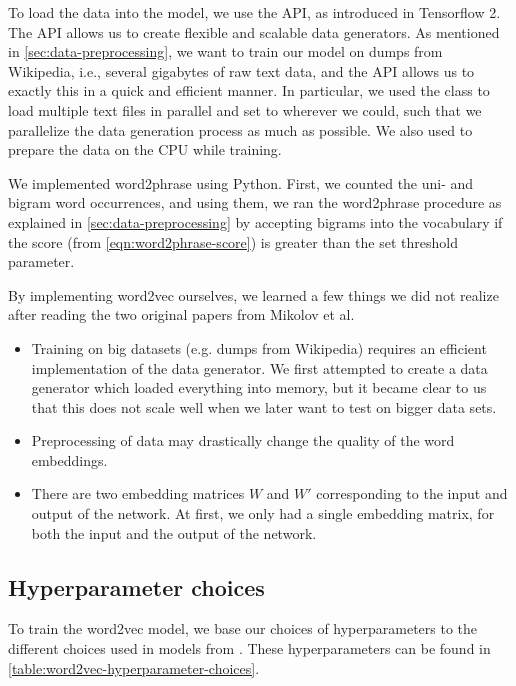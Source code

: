 To load the data into the model, we use the  API, as introduced in Tensorflow 2. The  API allows us to create flexible and scalable data generators. As mentioned in \cref{sec:data-preprocessing}, we want to train our model on dumps from Wikipedia, i.e., several gigabytes of raw text data, and the  API allows us to exactly this in a quick and efficient manner. In particular, we used the  class to load multiple text files in parallel and set  to  wherever we could, such that we parallelize the data generation process as much as possible. We also used  to prepare the data on the CPU while training.

We implemented word2phrase using Python. First, we counted the uni- and bigram word occurrences, and using them, we ran the word2phrase procedure as explained in \cref{sec:data-preprocessing} by accepting bigrams into the vocabulary if the score (from \cref{eqn:word2phrase-score}) is greater than the set threshold parameter.

By implementing word2vec ourselves, we learned a few things we did not realize after reading the two original papers from Mikolov et al. \cite{mikolov2013a, mikolov2013b}
\begin{itemize}
    \item Training on big datasets (e.g. dumps from Wikipedia) requires an efficient implementation of the data generator. We first attempted to create a data generator which loaded everything into memory, but it became clear to us that this does not scale well when we later want to test on bigger data sets.
    \item Preprocessing of data may drastically change the quality of the word embeddings.
    \item There are two embedding matrices $W$ and $W'$ corresponding to the input and output of the network. At first, we only had a single embedding matrix, for both the input and the output of the network.
\end{itemize}

\subsection{Hyperparameter choices}
\label{sec:hyperparameter-choices}
To train the word2vec model, we base our choices of hyperparameters to the different choices used in models from \cite{mikolov2013a, mikolov2013b}. These hyperparameters can be found in \cref{table:word2vec-hyperparameter-choices}.

